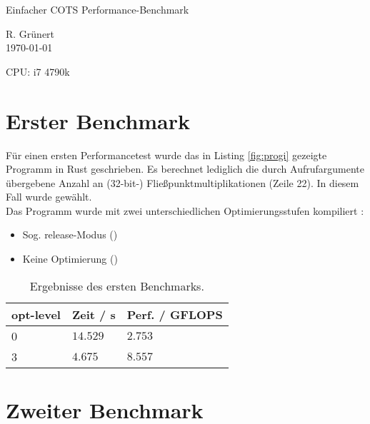 \documentclass[10pt, a4paper]{article}
\begin{document}
%

\begin{center}
  \Large{Einfacher COTS Performance-Benchmark}
\end{center}

\begin{flushright}
  R. Grünert\\
  \today
\end{flushright}

\begin{flushleft}
  CPU: i7 4790k
\end{flushleft}

\section{Erster Benchmark}



Für einen ersten Performancetest wurde das in Listing \ref{fig:progi} gezeigte Programm in Rust geschrieben.
Es berechnet lediglich die durch Aufrufargumente übergebene Anzahl an (32-bit-) Fließpunktmultiplikationen (Zeile 22).
In diesem Fall wurde  gewählt.\\

Das Programm wurde mit zwei unterschiedlichen Optimierungsstufen kompiliert \cite{profiles}:
\begin{itemize}
  \item Sog. \glqq{}release\grqq-Modus ()
  \item Keine Optimierung ()
\end{itemize}

\begin{table}[H]
  \centering
\begin{tabular}{|l|l|l|}
\hline
opt-level & Zeit / s & Perf. / GFLOPS \\ \hline
0         & $14.529$ & $2.753$        \\ \hline
3         & $4.675$  & $8.557$        \\ \hline
\end{tabular}
\caption{Ergebnisse des ersten Benchmarks.}
\end{table}

\section{Zweiter Benchmark}
\end{document}

